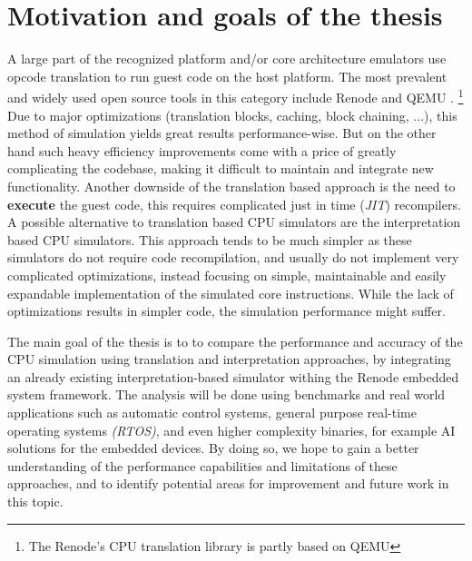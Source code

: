 \section{Motivation and goals of the thesis}

A large part of the recognized platform and/or core architecture emulators use opcode translation to run guest code
on the host platform. The most prevalent and widely used open source tools in this category include Renode \cite{Renode}
and QEMU \cite{Qemu}.%
\footnote{The Renode's CPU translation library is partly based on QEMU}
Due to major optimizations (translation blocks, caching, block chaining, ...), this method of  simulation yields
great results performance-wise. But on the other hand such heavy efficiency improvements come with a price 
of greatly 
complicating the codebase, making it difficult to maintain and integrate new functionality. Another downside of the
translation based approach is the need to \textbf{execute} the guest code, 
%
this requires complicated just in
time (\textit{JIT}) recompilers. A possible alternative to translation based CPU simulators are the interpretation
based CPU simulators. This approach tends to be much simpler as these simulators do not require code recompilation,
and usually do not implement very complicated optimizations, instead focusing on simple, maintainable and easily
expandable implementation of the simulated core instructions. While the lack of optimizations results in simpler
code, the simulation performance might suffer.

The main goal of the thesis is to to compare the performance and accuracy of the CPU simulation using translation
and interpretation approaches, by integrating an already existing interpretation-based simulator withing the Renode
embedded system framework. The analysis will be done using benchmarks and real world applications such as automatic control
systems, general purpose real-time operating systems \textit{(RTOS)}, and even higher complexity binaries, for example AI solutions for the embedded devices.
By doing so, we hope to gain a better understanding of the performance capabilities and limitations of these approaches,
and to identify potential areas for improvement and future work in this topic.

